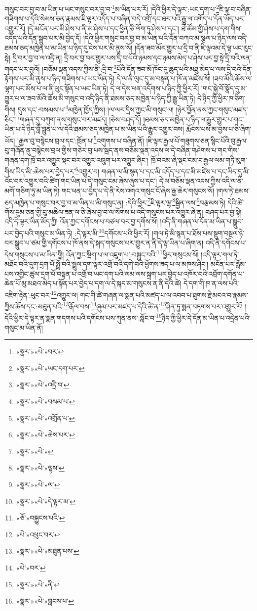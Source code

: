 གསུང་བར་བྱ་བ་མ་ཡིན་པ་ཡང་གསུང་བར་བྱ་བ་\footnote{«སྣར་»«པེ་»བར་}མ་ཡིན་པར་རོ། །དེའི་ཕྱིར་དེ་ལྟར་:ཡང་དག་པ་\footnote{«སྣར་»«པེ་»ཡང་དག་པར་}ཇི་ལྟ་བ་བཞིན་གཟིགས་པ་དེའི་སེམས་ཅན་རྣམས་ཇི་ལྟར་འདོད་པ་བཞིན་བདེ་འགྲོ་དང་ཐར་པའི་རྒྱུ་ལ་འགོད་པ་དོན་ཡོད་པར་འགྱུར་རོ། །དེ་མངོན་པར་མི་ཤེས་པ་ནི་མ་ཤེས་པ་དང་ཕྱིན་ཅི་ལོག་ཏུ་ཤེས་པ་དང་། ཐེ་ཚོམ་གྱི་ཤེས་པ་དག་གིས་འདོད་པའི་དོན་སྒྲུབ་པར་མི་བྱེད་དོ། །དེའི་ཕྱིར་གསུང་བར་བྱ་བ་མ་ཡིན་པའི་དོན་བཀའ་མ་སྩལ་པ་ཉིད་ལས་འདི་ཐམས་ཅད་མཁྱེན་པ་མ་ཡིན་པ་ཉིད་དུ་ངེས་པར་མི་ནུས་སོ། །དོན་ཟབ་མོར་གྱུར་པ་དྲི་བ་ནི་ཇི་ལྟའམ་དེ་ལྟ་ཡང་རུང་སྟེ། དྲི་བར་བྱ་བ་ལ་འདྲི་ན། དྲི་བར་བྱ་བར་གྱུར་པས་དྲི་བ་པོའི་ཉམས་དང་ཉམས་མེད་པ་ཤེས་པར་བྱ་སྟེ་དྲི་བའི་ལན་གདབ་པར་བྱའོ། །བཅོམ་ལྡན་འདས་ཀྱིས་ནི་:དྲི་བ་\footnote{«སྣར་»«པེ་»འདྲི་བ་}པོའི་དོན་ཟབ་མོ་ཁོང་དུ་ཆུད་པའི་མཐུ་མེད་པ་ལས་དྲི་བའི་དོན་རྟོགས་པར་མི་ནུས་པ་ཉིད་གཟིགས་པ་ཡང་ཡིན་ཏེ། དེ་ལ་ནི་ལུང་དུ་མ་བསྟན་པ་ཁོ་ན་མཛེས་སོ། །ཟབ་མོའི་ཆོས་ལ་ལྷག་པར་མོས་པ་ལ་ནི་ལུང་སྟོན་པ་ཡང་ཡིན་ཏེ། དེ་ལ་དེས་ཕན་འདོགས་པ་ཉིད་ཀྱི་ཕྱིར་རོ། །གང་སྐྱེ་བོ་སྣོད་དུ་མ་གྱུར་པ་ལ་ཟབ་མོའི་ཆོས་མི་གསུང་བ་འདི་ཉིད་ནི་ཐམས་ཅད་མཁྱེན་པ་ཉིད་ཀྱི་རྒྱུ་ཡིན་ཏེ། དེ་ཉིད་ཀྱི་ཕྱིར་ཁ་ཅིག་གིས། དུས་དང་:བསམས་པ་\footnote{«སྣར་»«པེ་»བསམ་པ་}མཁྱེན་ཁྱོད་ཀྱིས། །ལ་ལར་དྲིས་ཀྱང་མི་གསུང་ལ། །ཉེར་བྱོན་ནས་ཀྱང་གསུང་མཛད་ཅིང་། །གཞན་དུ་བཀུག་ནས་གསུང་བར་མཛད། །ཅེས་བཤད་དོ། །ཐམས་ཅད་མཁྱེན་པ་ཉིད་ལ་རྒྱུར་གྱུར་པ་གང་ཡིན་པ་དེ་ཉིད་བློ་བླུན་པ་ལ་དེའི་ཐམས་ཅད་མཁྱེན་པ་མ་ཡིན་པའི་རྒྱུར་འགྱུར་བས། རྨོངས་པས་མ་བྱས་པ་ཅི་ཞིག་ཡོད། །རྒྱལ་བུ་བསྙེངས་བྲལ་དང་:ཁྲོན་པ་\footnote{«སྣར་»«པེ་»འགྲོན་པ་}འགུགས་པ་བཞིན་ནོ། །ཇི་ལྟར་རྒྱལ་པོ་གཟུགས་ཅན་སྙིང་པོའི་བུ་རྒྱལ་བུ་གཞོན་ནུ་བསྙེངས་བྲལ་གྱིས་གཅེར་བུ་པས་སྦད་ནས་བཅོམ་ལྡན་འདས་ལ་དེ་བཞིན་གཤེགས་པ་གང་གིས་གཞན་དག་ཁྲོ་བར་འགྱུར་སྡང་བར་འགྱུར་འཁྲུག་པར་འགྱུར་ཞིང་། ཁྲོ་བའམ་ཞེ་སྡང་ངམ་ང་རྒྱལ་ལམ་གཏི་མུག་གིས་ཡིད་མི་:ཆེས་པར་བྱེད་པར་\footnote{«སྣར་»«པེ་»ཆེས་པར་}འགྱུར་བ། གཞན་ལ་མི་སྙན་པ་དང་མི་འདོད་པ་དང་མི་མཛེས་པ་དང་ཡིད་དུ་མི་འོང་བར་འགྱུར་བའི་ཚིག་གང་ཡིན་པ་དེ་གསུང་ངམ་ཞེས་ཞུས་པ་དང་། དེ་ལ་བཅོམ་ལྡན་འདས་ཀྱིས་འདི་ལ་ནི་མགོ་གཅིག་ཏུ་མ་ཡིན་ཏེ། གང་ཕན་པ་བྱེད་པ་དེ་ནི་རེས་འགའ་གསུང་ངོ་ཞེས་རྒྱ་ཆེར་གསུངས་སོ། །གལ་ཏེ་ཐམས་ཅད་མཁྱེན་པ་གསུང་བར་བྱ་བ་མ་ཡིན་པ་མི་གསུང་ན། :དེའི་ཕྱིར་\footnote{«སྣར་»«པེ་»}ཇི་ལྟར་ལྷ་\footnote{«སྣར་»«པེ་»ལྷས་}སྦྱིན་ལས་\footnote{«སྣར་»«པེ་»ལ་}བརྩམས་ཏེ། དེའི་ཚེ་གོས་དུམ་ཅན་གྱི་བུ་མཆིལ་ཟན་ལ་ཅི་ཞེས་བྱ་བ་ལ་སོགས་པ་འདི་གསུངས་པར་འགྱུར་ཞེ་ན། བཤད་པར་བྱ་སྟེ། འདི་དེ་ལྟར་ཡིན་མོད་ཀྱི། འོན་ཀྱང་དགོངས་པ་བཙལ་བར་བྱ་དགོས་སོ། །འདི་ནི་གཞན་ལ་དོན་མ་ཡིན་པ་སྒྲུབ་པར་བྱེད་པའི་གསུང་མ་ཡིན་ཏེ། :དེ་ལྟར་མི་\footnote{«སྣར་»«པེ་»དེ་ལྟར་མ་}དགོངས་པའི་ཕྱིར་རོ། །གལ་ཏེ་མི་སྙན་པ་ཐོས་པས་སྡུག་བསྔལ་ཉེ་བར་སྒྲུབ་པ་ཙམ་གྱི་དགོངས་པ་ཁོ་ནས་དེ་སྐད་གསུངས་པར་གྱུར་ན་ནི་དེ་ལྟ་ཡིན་པ་ཞིག་ན། འདི་ནི་དགོངས་པ་དེས་གསུངས་པ་མ་ཡིན་གྱི། འོན་ཀྱང་སྡིག་པ་ལ་འཇུག་པ་:བསྐྱུང་བའི་\footnote{«ཅོ་»བསྐྱུངས་པའི་}ཕྱིར་གསུངས་སོ། །འདི་ལྟར་གལ་ཏེ་མཐོང་བའི་དུག་དྲག་པོ་སྤྲོ་བའི་སྦྲུལ་དག་ལྟར་འགྲོ་བའི་དགེ་བའི་ཕྱོགས་ཟད་པ་ལ་མཁས་ཤིང་། མངོན་པར་རློམ་པས་འགྱིང་ཚུལ་དྲག་པོ་བསྟན་པ་འགྲོ་བ་ཡང་དག་པའི་ལམ་ལས་སྐྲག་པར་བྱེད་པ་འཁོར་བའི་འབྲོག་དགོན་པ་ཆེན་པོ་མུ་མཐའ་མེད་པ་སྟོན་པར་བྱེད་པ་དག་ལ་དེ་སྐད་མ་གསུངས་ན་ནི་དེའི་ཚེ། དེ་དག་གི་ཁ་ན་ལས་པའི་འཇིག་རྟེན་:ཕུང་བར་\footnote{«པེ་»འཕུང་བར་}འགྱུར་ལ། གང་གི་ཚེ་གཞན་ལ་སྨན་པའི་མཛད་པ་ལ་འབབ་པ་ཐུགས་རྗེ་མངའ་བ་རྣམས་ཀྱིས་ཆོས་དང་:མཐུན་པའི་\footnote{«སྣར་»«པེ་»མཐུན་པས་}རྒོལ་བས་\footnote{«པེ་»བར་}ཞུམ་པར་མཛད་པ་དེའི་ཚེ་ན་\footnote{«སྣར་»«པེ་»ནི་}ཤིན་ཏུ་སྨན་བཏགས་པར་འགྱུར་རོ། །དེའི་ཕྱིར་དེ་ལྟར་ན་སྨན་གདགས་པའི་དགོངས་པས་ཀུན་ནས་:སློང་བ་\footnote{«སྣར་»«པེ་»བླངས་པ་}ཉིད་ཀྱི་ཕྱིར་དེ་དོན་མ་ཡིན་པ་འདྲེན་པའི་གསུང་མ་ཡིན་ནོ། 